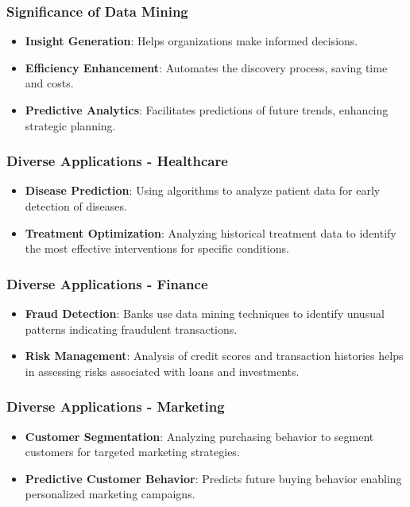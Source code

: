 \documentclass{beamer}
\begin{document}
\begin{frame}[fragile]
    \frametitle{Significance of Data Mining}
    \begin{itemize}
        \item \textbf{Insight Generation}: Helps organizations make informed decisions.
        \item \textbf{Efficiency Enhancement}: Automates the discovery process, saving time and costs.
        \item \textbf{Predictive Analytics}: Facilitates predictions of future trends, enhancing strategic planning.
    \end{itemize}
\end{frame}

\begin{frame}[fragile]
    \frametitle{Diverse Applications - Healthcare}
    \begin{itemize}
        \item \textbf{Disease Prediction}: Using algorithms to analyze patient data for early detection of diseases.
        \item \textbf{Treatment Optimization}: Analyzing historical treatment data to identify the most effective interventions for specific conditions.
    \end{itemize}
\end{frame}

\begin{frame}[fragile]
    \frametitle{Diverse Applications - Finance}
    \begin{itemize}
        \item \textbf{Fraud Detection}: Banks use data mining techniques to identify unusual patterns indicating fraudulent transactions.
        \item \textbf{Risk Management}: Analysis of credit scores and transaction histories helps in assessing risks associated with loans and investments.
    \end{itemize}
\end{frame}

\begin{frame}[fragile]
    \frametitle{Diverse Applications - Marketing}
    \begin{itemize}
        \item \textbf{Customer Segmentation}: Analyzing purchasing behavior to segment customers for targeted marketing strategies.
        \item \textbf{Predictive Customer Behavior}: Predicts future buying behavior enabling personalized marketing campaigns.
    \end{itemize}
\end{frame}
\end{document}
